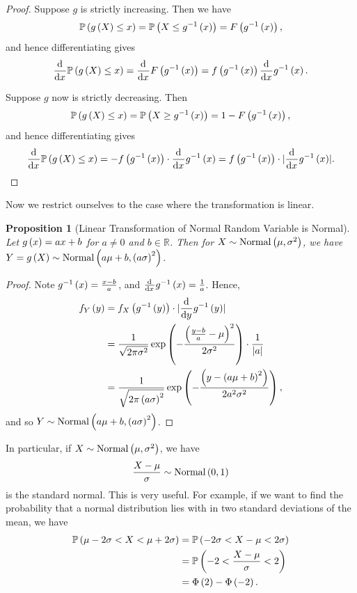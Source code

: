 \documentclass{article}
\newtheorem{proposition}[theorem]{Proposition}
\theoremstyle{definition}
\theoremstyle{remark}
\DeclarePairedDelimiter{\abs}{\lvert}{\rvert}
\newcommand{\RR}{\mathbb{R}}
\newcommand{\Prob}{\mathbb{P}}
\newcommand{\inverse}{^{-1}}
\newcommand{\sNormCdf}{\Phi}
\newcommand{\Normal}{\operatorname{Normal}}
\begin{document}
\begin{proof}
    Suppose \(g\) is strictly increasing. Then we have
    \[
        \Prob\pqty{g\pqty{X} \leq x} = \Prob\pqty{X \leq g\inverse\pqty{x}} = F\pqty{g\inverse\pqty{x}},
    \]
    and hence differentiating gives
    \[
        \dv{x} \Prob\pqty{g \pqty{X} \leq x} = \dv{x} F\pqty{g\inverse\pqty{x}} = f\pqty{g\inverse\pqty{x}} \dv{x} g\inverse\pqty{x}.
    \]

    Suppose \(g\) now is strictly decreasing. Then
    \[
        \Prob\pqty{g\pqty{X} \leq x} = \Prob\pqty{X \geq g\inverse\pqty{x}} = 1 - F\pqty{g\inverse\pqty{x}},
    \]
    and hence differentiating gives
    \[
        \dv{x} \Prob\pqty{g\pqty{X} \leq x} = - f\pqty{g\inverse\pqty{x}} \cdot \dv{x} g\inverse\pqty{x} = f\pqty{g\inverse\pqty{x}} \cdot \abs{\dv{x} g\inverse\pqty{x}}.
    \]
\end{proof}

Now we restrict ourselves to the case where the transformation is linear.

\begin{proposition}[Linear Transformation of Normal Random Variable is Normal]
    \label{prop:lin-transformatino-normal}%
    Let \(g\left(x\right) = ax + b\) for \(a \neq 0\) and \(b \in \RR\). Then for \(X \sim \Normal\pqty{\mu, \sigma^2}\), we have \(Y = g\pqty{X} \sim \Normal\pqty{a \mu + b, \pqty{a \sigma}^2}\).
\end{proposition}

\begin{proof}
    Note \(g\inverse\pqty{x} = \frac{x - b}{a}\), and \(\dv{x} g\inverse\pqty{x} = \frac{1}{a}\). Hence,
    \begin{align*}
        f_Y\pqty{y} &= f_X\pqty{g\inverse\pqty{y}} \cdot \abs{\dv{y} g\inverse\pqty{y}} \\
        &= \frac{1}{\sqrt{2 \pi \sigma^2}} \exp\pqty{- \frac{\pqty{\frac{y - b}{a} - \mu}^2}{2 \sigma^2}} \cdot \frac{1}{\abs{a}} \\
        &= \frac{1}{\sqrt{2 \pi \pqty{a \sigma}^2}} \exp\pqty{- \frac{\pqty{y - \pqty{a\mu + b}^2}}{2 a^2 \sigma^2}},
    \end{align*}
    and so \(Y \sim \Normal\pqty{a \mu + b, \pqty{a \sigma}^2}\).
\end{proof}

In particular, if \(X \sim \Normal\pqty{\mu, \sigma^2}\), we have
\[
    \frac{X - \mu}{\sigma} \sim \Normal\pqty{0, 1}
\]
is the standard normal. This is very useful. For example, if we want to find the probability that a normal distribution lies with in two standard deviations of the mean, we have
\begin{align*}
    \Prob\pqty{\mu - 2 \sigma < X < \mu + 2 \sigma} &= \Prob\pqty{-2\sigma < X - \mu < 2\sigma} \\
    &= \Prob\pqty{-2 < \frac{X - \mu}{\sigma} < 2} \\
    &= \sNormCdf\pqty{2} - \sNormCdf\pqty{-2}.
\end{align*}
\end{document}
